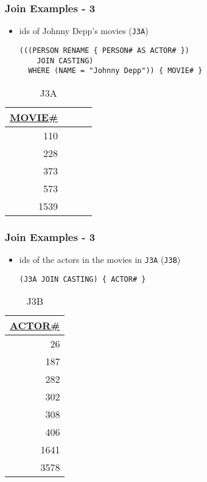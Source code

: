 \documentclass[dvipsnames]{beamer}
\theoremstyle{plain}
\begin{document}
\begin{frame}[fragile]
  \frametitle{Join Examples - 3}

  \begin{itemize}
    \item ids of Johnny Depp's movies (\texttt{J3A})
    \begin{lstlisting}
(((PERSON RENAME { PERSON# AS ACTOR# })
    JOIN CASTING)
  WHERE (NAME = "Johnny Depp")) { MOVIE# }
    \end{lstlisting}
  \end{itemize}

  \vspace{-10pt}
  \begin{tiny}
  \begin{table}
    \caption{J3A}
    \begin{tabular}{|r|l|r|r|}\hline
\underline{MOVIE\#}\\[2pt]\hline\hline
                110\\\hline
                228\\\hline
                373\\\hline
                573\\\hline
               1539\\\hline
    \end{tabular}
  \end{table}
  \end{tiny}
\end{frame}

\begin{frame}[fragile]
  \frametitle{Join Examples - 3}

  \begin{itemize}
    \item ids of the actors in the movies in \texttt{J3A}
      (\texttt{J3B})
    \begin{lstlisting}
(J3A JOIN CASTING) { ACTOR# }
    \end{lstlisting}
  \end{itemize}

  \vspace{-10pt}
  \begin{tiny}
  \begin{table}
    \caption{J3B}
    \begin{tabular}{|r|}\hline
\underline{ACTOR\#}\\[2pt]\hline\hline
                 26\\\hline
                187\\\hline
                282\\\hline
                302\\\hline
                308\\\hline
                406\\\hline
               1641\\\hline
               3578\\\hline
    \end{tabular}
  \end{table}
  \end{tiny}
\end{frame}
\end{document}
